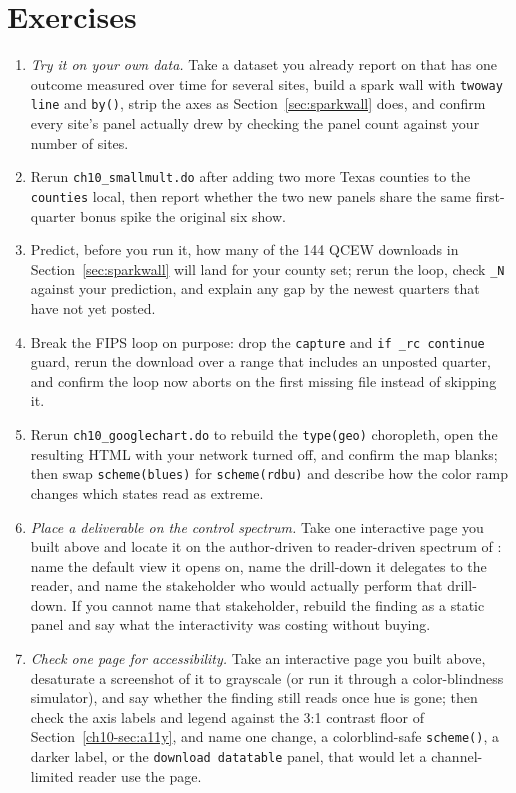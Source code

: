 \documentclass[
    a4paper,
    fontsize=10pt,
    twoside=true,
    numbers=noenddot,
]{kaobook}
\begin{document}
\section*{Exercises}
\begin{enumerate}
\item \emph{Try it on your own data.} Take a dataset you already report on that has one outcome measured over time for several sites, build a spark wall with \texttt{twoway line} and \texttt{by()}, strip the axes as Section~\ref{sec:sparkwall} does, and confirm every site's panel actually drew by checking the panel count against your number of sites.
\item Rerun \texttt{ch10\_smallmult.do} after adding two more Texas counties to the \texttt{counties} local, then report whether the two new panels share the same first-quarter bonus spike the original six show.
\item Predict, before you run it, how many of the 144 QCEW downloads in Section~\ref{sec:sparkwall} will land for your county set; rerun the loop, check \texttt{\_N} against your prediction, and explain any gap by the newest quarters that have not yet posted.
\item Break the FIPS loop on purpose: drop the \texttt{capture} and \texttt{if \_rc continue} guard, rerun the download over a range that includes an unposted quarter, and confirm the loop now aborts on the first missing file instead of skipping it.
\item Rerun \texttt{ch10\_googlechart.do} to rebuild the \texttt{type(geo)} choropleth, open the resulting HTML with your network turned off, and confirm the map blanks; then swap \texttt{scheme(blues)} for \texttt{scheme(rdbu)} and describe how the color ramp changes which states read as extreme.
\item \emph{Place a deliverable on the control spectrum.} Take one interactive page you built above and locate it on the author-driven to reader-driven spectrum of \textcite{segel2010narrative}: name the default view it opens on, name the drill-down it delegates to the reader, and name the stakeholder who would actually perform that drill-down. If you cannot name that stakeholder, rebuild the finding as a static panel and say what the interactivity was costing without buying.
\item \emph{Check one page for accessibility.} Take an interactive page you built above, desaturate a screenshot of it to grayscale (or run it through a color-blindness simulator), and say whether the finding still reads once hue is gone; then check the axis labels and legend against the 3:1 contrast floor of Section~\ref{ch10-sec:a11y}, and name one change, a colorblind-safe \texttt{scheme()}, a darker label, or the \texttt{download datatable} panel, that would let a channel-limited reader use the page.

\end{enumerate}
\end{document}
